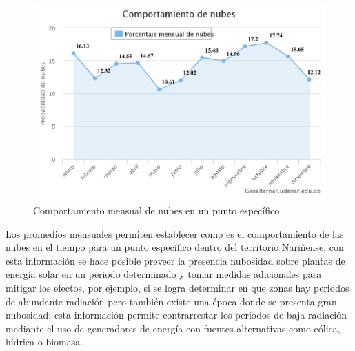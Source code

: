 \begin{figure}[htb]
  \centering 
  \includegraphics[scale=0.3]{pictures/nubesmes.png}
  \caption{Comportamiento mensual de nubes en un punto específico}
  \label{fig:nuvesmes}
\end{figure}

Los promedios mensuales permiten establecer como es el comportamiento de las nubes en el tiempo para un
punto específico dentro del territorio Nariñense, con esta información se hace posible preveer la presencia  
nubosidad sobre plantas de energía solar en un periodo determinado y tomar medidas adicionales para mitigar los efectos, 
por ejemplo, si se logra determinar en que zonas hay periodos de abundante radiación pero también existe una época donde se presenta gran nubosidad;
esta información permite contrarrestar los periodos de baja radiación mediante el uso de generadores de energía con fuentes alternativas como eólica, 
hídrica o biomasa.

